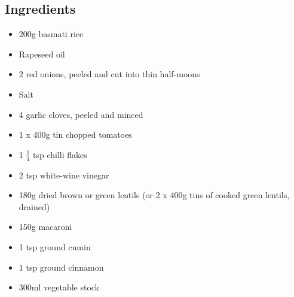 \documentclass{book}
\begin{document}
\subsection*{Ingredients}
\begin{itemize}
\item 200g basmati rice
\item Rapeseed oil 
\item 2 red onions, peeled and cut into thin half-moons
\item Salt
\item 4 garlic cloves, peeled and minced 
\item 1 x 400g tin chopped tomatoes 
\item 1 $\frac{1}{4}$ tsp chilli flakes 
\item 2 tsp white-wine vinegar
\item 180g dried brown or green lentils (or 2 x 400g tins of cooked green lentils, drained)
\item 150g macaroni
\item 1 tsp ground cumin 
\item 1 tsp ground cinnamon 
\item 300ml vegetable stock
\end{itemize}
\end{document}
